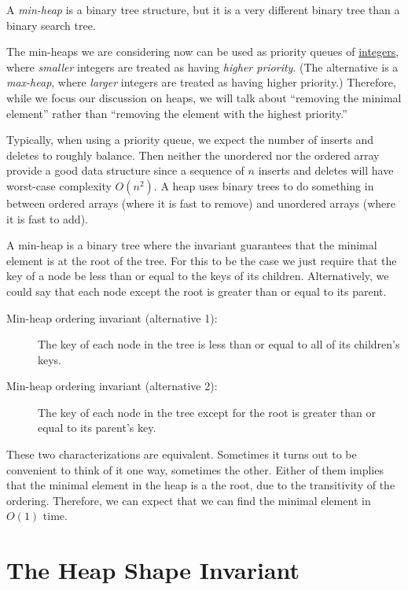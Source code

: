 A \emph{min-heap} is a binary tree structure, but it is a very
different binary tree than a binary search tree.

The min-heaps we are considering now can be used as priority queues of
\underline{integers}, where \emph{smaller} integers are treated as having
\emph{higher priority}. (The alternative is a \emph{max-heap},
where \emph{larger} integers are treated as having higher priority.)
Therefore, while we focus our discussion on heaps, we will talk about
``removing the minimal element'' rather than ``removing the element
with the highest priority.''

Typically, when using a priority queue, we expect the number of
inserts and deletes to roughly balance.  Then neither the unordered
nor the ordered array provide a good data structure since a sequence
of $n$ inserts and deletes will have worst-case complexity $O(n^2)$.
A heap uses binary trees to do something in between ordered arrays
(where it is fast to remove) and unordered arrays (where it is fast to
add).

A min-heap is a binary tree where the invariant guarantees that
the minimal element is at the root of the tree.  For this to be the
case we just require that the key of a node be less than or equal to the
keys of its children.  Alternatively, we could say that each node
except the root is greater than or equal to its parent.
\begin{description}
\item[Min-heap ordering invariant (alternative 1): ] %
  The key of each node in the tree is less than or equal to all of its
  children's keys.
\item[Min-heap ordering invariant (alternative 2): ]%
  The key of each node in the tree except for the root is greater than or
  equal to its parent's key.
\end{description}
These two characterizations are equivalent.  Sometimes it turns out to
be convenient to think of it one way, sometimes the other.  Either of
them implies that the minimal element in the heap is a the root, due
to the transitivity of the ordering.  Therefore, we can expect that we
can find the minimal element in $O(1)$ time.


\section{The Heap Shape Invariant}
\label{sec:pq:heap_shape}

